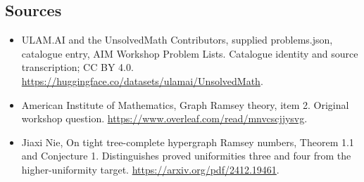 \documentclass[11pt,a4paper]{article}
\begin{document}
\subsection{Sources}
\begin{itemize}
\item[S1] ULAM.AI and the UnsolvedMath Contributors, supplied problems.json, catalogue entry, AIM Workshop Problem Lists. Catalogue identity and source transcription; CC BY 4.0.
\url{https://huggingface.co/datasets/ulamai/UnsolvedMath}.
\item[S2] American Institute of Mathematics, Graph Ramsey theory, item 2. Original workshop question.
\url{https://www.overleaf.com/read/mnvcscjjysvg}.
\item[S3] Jiaxi Nie, On tight tree-complete hypergraph Ramsey numbers, Theorem 1.1 and Conjecture 1. Distinguishes proved uniformities three and four from the higher-uniformity target.
\url{https://arxiv.org/pdf/2412.19461}.
\end{itemize}
\end{document}
